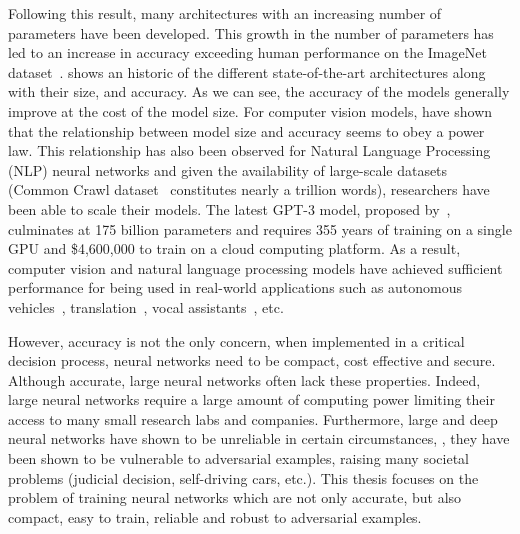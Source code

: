 Following this result, many architectures with an increasing number of parameters have been developed.
This growth in the number of parameters has led to an increase in accuracy exceeding human performance on the ImageNet dataset~\cite{he2015delving}.
 shows an historic of the different state-of-the-art architectures along with their size, and accuracy.
As we can see, the accuracy of the models generally improve at the cost of the model size.
For computer vision models, \citet{tan2019efficientnet} have shown that the relationship between model size and accuracy seems to obey a power law. 
This relationship has also been observed for Natural Language Processing (NLP) neural networks and given the availability of large-scale datasets (Common Crawl dataset~\cite{raffel2019exploring} constitutes nearly a trillion words), researchers have been able to scale their models.
The latest GPT-3 model, proposed by~\citet{brown2020language}, culminates at 175 billion parameters and requires 355 years of training on a single GPU and \$4,600,000 to train on a cloud computing platform.
As a result, computer vision and natural language processing models have achieved sufficient performance for being used in real-world applications such as autonomous vehicles~\cite{fagnant2015preparing}, translation~\cite{wu2016google}, vocal assistants~\cite{li2017acoustic}, etc.

However, accuracy is not the only concern, when implemented in a critical decision process, neural networks need to be compact, cost effective and secure.
Although accurate, large neural networks often lack these properties.
Indeed, large neural networks require a large amount of computing power limiting their access to many small research labs and companies.
Furthermore, large and deep neural networks have shown to be unreliable in certain circumstances, \ie, they have been shown to be vulnerable to adversarial examples, raising many societal problems (judicial decision, self-driving cars, etc.).
This thesis focuses on the problem of training neural networks which are not only accurate, but also compact, easy to train, reliable and robust to adversarial examples.

